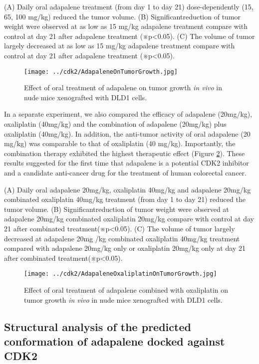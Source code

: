 (A) Daily oral adapalene treatment (from day 1 to day 21) dose-dependently (15, 65, 100 mg/kg) reduced the tumor volume. (B) Significantreduction of tumor weight were observed at as low as 15 mg/kg adapalene treatment compare with control at day 21 after adapalene treatment (※p<0.05). (C) The volume of tumor largely decreased at as low as 15 mg/kg adapalene treatment compare with control at day 21 after adapalene treatment (※p<0.05).

\begin{figure}
\centering
\texttt{[image: ../cdk2/AdapaleneOnTumorGrowth.jpg]}
\caption{Effect of oral treatment of adapalene on tumor growth \textit{in vivo} in nude mice xenografted with DLD1 cells.}
\label{cdk2:AdapaleneOnTumorGrowth}
\end{figure}

In a separate experiment, we also compared the efficacy of adapalene (20mg/kg), oxaliplatin (40mg/kg) and the combination of adapalene (20mg/kg) plus oxaliplatin (40mg/kg).
In addition, the anti-tumor activity of oral adapalene (20 mg/kg) was comparable to that of oxaliplatin (40 mg/kg). Importantly, the combination therapy exhibited the highest therapeutic effect (Figure \ref{cdk2:AdapaleneOxaliplatinOnTumorGrowth}). These results suggested for the first time that adapalene is a potential CDK2 inhibitor and a candidate anti-cancer drug for the treatment of human colorectal cancer.

(A) Daily oral adapalene 20mg/kg, oxaliplatin 40mg/kg and adapalene 20mg/kg combinated oxaliplatin 40mg/kg treatment (from day 1 to day 21) reduced the tumor volume. (B) Significantreduction of tumor weight were observed at adapalene 20mg/kg combinated oxaliplatin 20mg/kg compare with control at day 21 after combinated treatment(※p<0.05). (C) The volume of tumor largely decreased at adapalene 20mg /kg combinated oxaliplatin 40mg/kg treatment compared with adapalene 20mg/kg only or oxaliplatin 20mg/kg only at day 21 after combinated treatment(※p<0.05).

\begin{figure}
\centering
\texttt{[image: ../cdk2/AdapaleneOxaliplatinOnTumorGrowth.jpg]}
\caption{Effect of oral treatment of adapalene combined with oxaliplatin on tumor growth \textit{in vivo} in nude mice xenografted with DLD1 cells.}
\label{cdk2:AdapaleneOxaliplatinOnTumorGrowth}
\end{figure}

\subsection{Structural analysis of the predicted conformation of adapalene docked against CDK2}

